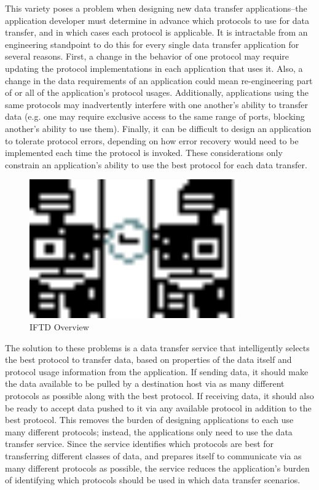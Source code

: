 This variety poses a problem when designing new data transfer applications--the application developer must determine in advance which protocols to use for data transfer, and in which cases each protocol is applicable.  It is intractable from an engineering standpoint to do this for every single data transfer application for several reasons.  First, a change in the behavior of one protocol may require updating the protocol implementations in each application that uses it.  Also, a change in the data requirements of an application could mean re-engineering part of or all of the application's protocol usages.  Additionally, applications using the same protocols may inadvertently interfere with one another's ability to transfer data (e.g. one may require exclusive access to the same range of ports, blocking another's ability to use them).  Finally, it can be difficult to design an application to tolerate protocol errors, depending on how error recovery would need to be implemented each time the protocol is invoked.  These considerations only constrain an application's ability to use the best protocol for each data transfer.

\begin{figure}[H]
    \centering
    \includegraphics[width=0.8\textwidth]{diagrams/iftd-overview}
    \caption{IFTD Overview}
    \label{iftd-overview}
\end{figure}

The solution to these problems is a data transfer service that intelligently selects the best protocol to transfer data, based on properties of the data itself and protocol usage information from the application.  If sending data, it should make the data available to be pulled by a destination host via as many different protocols as possible along with the best protocol.  If receiving data, it should also be ready to accept data pushed to it via any available protocol in addition to the best protocol.  This removes the burden of designing applications to each use many different protocols; instead, the applications only need to use the data transfer service.  Since the service identifies which protocols are best for transferring different classes of data, and prepares itself to communicate via as many different protocols as possible, the service reduces the application's burden of identifying which protocols should be used in which data transfer scenarios.

